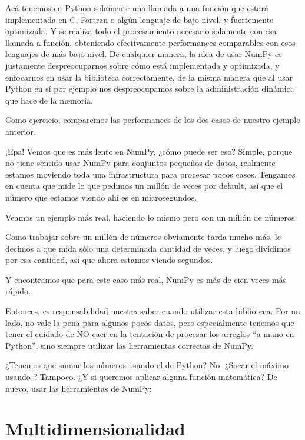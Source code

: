 Acá tenemos en Python solamente una llamada a una función que estará implementada en C, Fortran o algún lenguaje de bajo nivel, y fuertemente optimizada. Y se realiza todo el procesamiento necesario solamente con esa llamada a función, obteniendo efectivamente performances comparables con esos lenguajes de más bajo nivel. De cualquier manera, la idea de usar NumPy es justamente despreocuparnos sobre cómo está implementada y optimizada, y enfocarnos en usar la biblioteca correctamente, de la misma manera que al usar Python en sí por ejemplo nos despreocupamos sobre la administración dinámica que hace de la memoria.

Como ejercicio, comparemos las performances de los dos casos de nuestro ejemplo anterior.


¡Epa! Vemos que es más lento en NumPy, ¿cómo puede ser eso? Simple, porque no tiene sentido usar NumPy para conjuntos pequeños de datos, realmente estamos moviendo toda una infrastructura para procesar pocos casos. Tengamos en cuenta que  mide lo que pedimos un millón de veces por default, así que el número que estamos viendo ahí es en microsegundos.

Veamos un ejemplo más real, haciendo lo mismo pero con un millón de números:


Como trabajar sobre un millón de números obviamente tarda mucho más, le decimos a  que mida sólo una determinada cantidad de veces, y luego dividimos por esa cantidad, así que ahora estamos viendo segundos.

Y encontramos que para este caso más real, NumPy es más de cien veces más rápido.

Entonces, es responsabilidad nuestra saber cuando utilizar esta biblioteca. Por un lado, no vale la pena para algunos pocos datos, pero especialmente tenemos que tener el cuidado de NO caer en la tentación de procesar los arreglos ``a mano en Python'', sino siempre utilizar las herramientas correctas de NumPy.

¿Tenemos que sumar los números usando el  de Python? No. ¿Sacar el máximo usando ? Tampoco. ¿Y si queremos aplicar alguna función matemática? De nuevo, usar las herramientas de NumPy:



\section{Multidimensionalidad}

